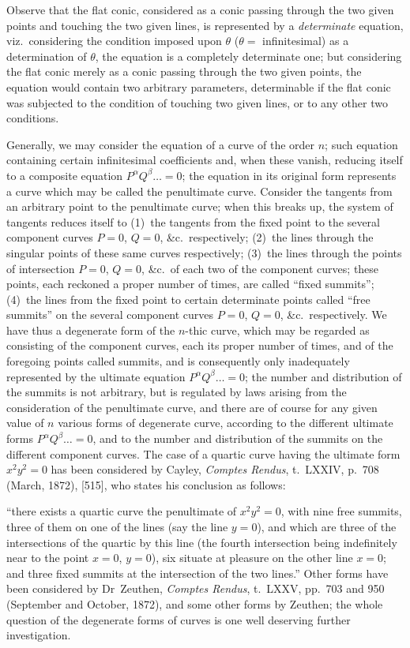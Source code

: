 \documentclass[12pt,a4paper]{article}
\begin{document}
Observe that the flat conic, considered as a conic passing through the two given points and touching the two given lines, is represented by a \textit{determinate} equation, viz.~considering the condition imposed upon $\theta$ ($\theta = $ infinitesimal) as a determination of $\theta$, the equation is a completely determinate one; but considering the flat conic merely as a conic passing through the two given points, the equation would contain two arbitrary parameters, determinable if the flat conic was subjected to the condition of touching two given lines, or to any other two conditions.

Generally, we may consider the equation of a curve of the order $n$; such equation containing certain infinitesimal coefficients and, when these vanish, reducing itself to a composite equation $P^\alpha Q^\beta \ldots = 0$; the equation in its original form represents a curve which may be called the penultimate curve. Consider the tangents from an arbitrary point to the penultimate curve; when this breaks up, the system of tangents reduces itself to (1)~the tangents from the fixed point to the several component curves $P = 0$, $Q = 0$, \&c.\ respectively; (2)~the lines through the singular points of these same curves respectively; (3)~the lines through the points of intersection $P = 0$, $Q = 0$, \&c.\ of each two of the component curves; these points, each reckoned a proper number of times, are called ``fixed summits''; (4)~the lines from the fixed point to certain determinate points called ``free summits'' on the several component curves $P = 0$, $Q = 0$, \&c.\ respectively. We have thus a degenerate form of the $n$-thic curve, which may be regarded as consisting of the component curves, each its proper number of times, and of the foregoing points called summits, and is consequently only inadequately represented by the ultimate equation $P^\alpha Q^\beta \ldots = 0$; the number and distribution of the summits is not arbitrary, but is regulated by laws arising from the consideration of the penultimate curve, and there are of course for any given value of $n$ various forms of degenerate curve, according to the different ultimate forms $P^\alpha Q^\beta \ldots = 0$, and to the number and distribution of the summits on the different component curves. The case of a quartic curve having the ultimate form $x^2y^2 = 0$ has been considered by Cayley, \textit{Comptes Rendus}, t.~LXXIV, p.~708 (March, 1872), [515], who states his conclusion as follows:

``there exists a quartic curve the penultimate of $x^2y^2 = 0$, with nine free summits, three of them on one of the lines (say the line $y = 0$), and which are three of the intersections of the quartic by this line (the fourth intersection being indefinitely near to the point $x = 0$, $y = 0$), six situate at pleasure on the other line $x = 0$; and three fixed summits at the intersection of the two lines.'' Other forms have been considered by Dr~Zeuthen, \textit{Comptes Rendus}, t.~LXXV, pp.~703 and 950 (September and October, 1872), and some other forms by Zeuthen; the whole question of the degenerate forms of curves is one well deserving further investigation.
\end{document}
